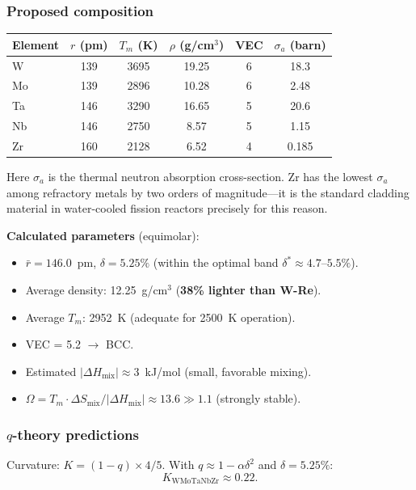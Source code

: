\documentclass[12pt,letterpaper]{article}
\theoremstyle{definition}
\begin{document}
\subsubsection{Proposed composition}

\begin{center}
\begin{tabular}{@{}lccccc@{}}
\toprule
Element & $r$ (pm) & $T_m$ (K) & $\rho$ (g/cm$^3$) & VEC & $\sigma_a$ (barn) \\
\midrule
W  & 139 & 3695 & 19.25 & 6 & 18.3 \\
Mo & 139 & 2896 & 10.28 & 6 & 2.48 \\
Ta & 146 & 3290 & 16.65 & 5 & 20.6 \\
Nb & 146 & 2750 & 8.57  & 5 & 1.15 \\
Zr & 160 & 2128 & 6.52  & 4 & 0.185 \\
\bottomrule
\end{tabular}
\end{center}

\noindent Here $\sigma_a$ is the thermal neutron absorption cross-section.  Zr has the lowest $\sigma_a$ among refractory metals by two orders of magnitude---it is the standard cladding material in water-cooled fission reactors precisely for this reason.

\textbf{Calculated parameters} (equimolar):
\begin{itemize}
  \item $\bar{r} = 146.0$~pm, \quad $\delta = 5.25\%$ \quad (within the optimal band $\delta^* \approx 4.7$--$5.5\%$).
  \item Average density: 12.25~g/cm$^3$ \quad (\textbf{38\% lighter than W-Re}).
  \item Average $T_m$: 2952~K \quad (adequate for 2500~K operation).
  \item VEC = 5.2 $\to$ BCC.
  \item Estimated $|\Delta H_{\mathrm{mix}}| \approx 3$~kJ/mol (small, favorable mixing).
  \item $\Omega = T_m \cdot \Delta S_{\mathrm{mix}} / |\Delta H_{\mathrm{mix}}| \approx 13.6 \gg 1.1$ \quad (strongly stable).
\end{itemize}

\subsubsection{$q$-theory predictions}

Curvature: $K = (1-q) \times 4/5$.  With $q \approx 1 - \alpha\delta^2$ and $\delta = 5.25\%$:
\begin{equation}
  K_{\mathrm{WMoTaNbZr}} \approx 0.22.
\end{equation}
\end{document}
